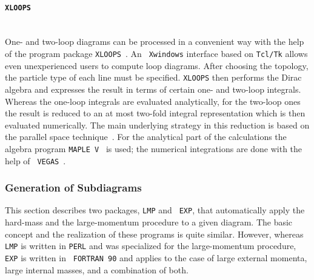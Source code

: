 
\paragraph{{\tt XLOOPS}}\mbox{}\\[1em]
%
One- and two-loop diagrams can be processed in a convenient way with the
help of the program package {\tt XLOOPS}~\cite{XLOOPS}.  An {\tt
  Xwindows} interface based on {\tt Tcl/Tk} allows even unexperienced
users to compute loop diagrams.  After choosing the topology, the
particle type of each line must be specified.  {\tt XLOOPS} then
performs the Dirac algebra and expresses the result in terms of certain
one- and two-loop integrals.  Whereas the one-loop integrals are
evaluated analytically, for the two-loop ones the result is reduced to
an at most two-fold integral representation which is then evaluated
numerically.  The main underlying strategy in this reduction is based on
the parallel space technique~\cite{CzaKilKre95}.  For the analytical
part of the calculations the algebra program {\tt MAPLE~V}~\cite{MAPLE}
is used; the numerical integrations are done with the help of {\tt
  VEGAS}~\cite{VEGAS,pvegas}.



\subsubsection{\label{subgensd}Generation of Subdiagrams}
%

This section describes two packages, {\tt LMP} and {\tt
  EXP}, that automatically apply the hard-mass
and the large-momentum procedure to a given diagram. The basic
concept and the realization of these programs is quite similar.
However, whereas {\tt LMP} is written in {\tt PERL} and was specialized
for the large-momentum procedure, {\tt EXP} is written in {\tt
  FORTRAN~90} and applies to the case of large external momenta, large
internal masses, and a combination of both.


